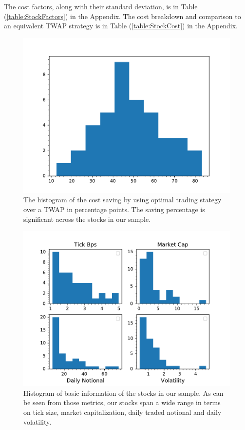 \documentclass{article}
\begin{document}
The cost factors, along with their standard deviation, is in Table (\ref{table:StockFactors}) in the Appendix. The cost breakdown and comparison to an equivalent TWAP strategy is in Table (\ref{table:StockCost}) in the Appendix.

\begin{figure}[h]
  \includegraphics[width=\textwidth]{CostSavingChart}
  \caption{The histogram of the cost saving by using optimal trading stategy over a TWAP in percentage points. The saving percentage is significant across the stocks in our sample.}
  \label{fig:hist_cost_saving}
\end{figure}

\begin{figure}[h]
  \includegraphics[width=\textwidth]{StockBasicsHist}
  \caption{Histogram of basic information of the stocks in our sample. As can be seen from those metrics, our stocks span a wide range in terms on tick size, market capitalization, daily traded notional and daily volatility.}
  \label{fig:stock_basics}
\end{figure}
\end{document}

